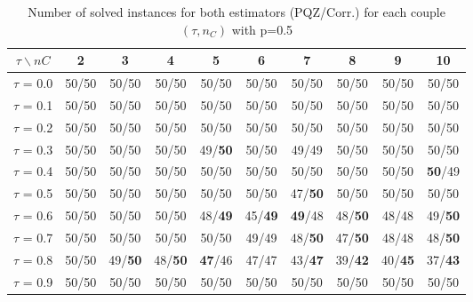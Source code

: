 \begin{table}[H]
\centering


\begin{tabular}{|c|c|c|c|c|c|c|c|c|c|}
\hline
$\tau \backslash nC$ & 2 & 3 & 4 & 5 & 6 & 7 & 8 & 9 & 10 \\
\hline
$\tau$ = 0.0 & 50/50 & 50/50 & 50/50 & 50/50 & 50/50 & 50/50 & 50/50 & 50/50 & 50/50 \\
\hline
$\tau$ = 0.1 & 50/50 & 50/50 & 50/50 & 50/50 & 50/50 & 50/50 & 50/50 & 50/50 & 50/50 \\
\hline
$\tau$ = 0.2 & 50/50 & 50/50 & 50/50 & 50/50 & 50/50 & 50/50 & 50/50 & 50/50 & 50/50 \\
\hline
$\tau$ = 0.3 & 50/50 & 50/50 & 50/50 & 49/\textbf{50} & 50/50 & 49/49 & 50/50 & 50/50 & 50/50 \\
\hline
$\tau$ = 0.4 & 50/50 & 50/50 & 50/50 & 50/50 & 50/50 & 50/50 & 50/50 & 50/50 & \textbf{50}/49 \\
\hline
$\tau$ = 0.5 & 50/50 & 50/50 & 50/50 & 50/50 & 50/50 & 47/\textbf{50} & 50/50 & 50/50 & 50/50 \\
\hline
$\tau$ = 0.6 & 50/50 & 50/50 & 50/50 & 48/\textbf{49} & 45/\textbf{49} & \textbf{49}/48 & 48/\textbf{50} & 48/48 & 49/\textbf{50} \\
\hline
$\tau$ = 0.7 & 50/50 & 50/50 & 50/50 & 50/50 & 49/49 & 48/\textbf{50} & 47/\textbf{50} & 48/48 & 48/\textbf{50} \\
\hline
$\tau$ = 0.8 & 50/50 & 49/\textbf{50} & 48/\textbf{50} & \textbf{47}/46 & 47/47 & 43/\textbf{47} & 39/\textbf{42} & 40/\textbf{45} & 37/\textbf{43} \\
\hline
$\tau$ = 0.9 & 50/50 & 50/50 & 50/50 & 50/50 & 50/50 & 50/50 & 50/50 & 50/50 & 50/50 \\
\hline
\end{tabular}
~	\caption{Number of solved instances for both estimators (PQZ/Corr.) for each couple $(\tau, n_C)$ with p=0.5}
    \label{nbSolved05}
\end{table}
